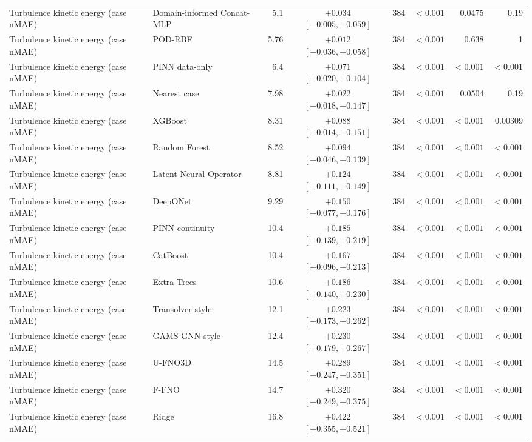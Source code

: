 \begin{landscape}
\begin{longtable}{p{4.0cm}p{3.4cm}rcrrrr}
Turbulence kinetic energy (case nMAE) & Domain-informed Concat-MLP & 5.1 & $+0.034$ $[-0.005, +0.059]$ & 384 & $< 0.001$ & 0.0475 & 0.19 \\
Turbulence kinetic energy (case nMAE) & POD-RBF & 5.76 & $+0.012$ $[-0.036, +0.058]$ & 384 & $< 0.001$ & 0.638 & 1 \\
Turbulence kinetic energy (case nMAE) & PINN data-only & 6.4 & $+0.071$ $[+0.020, +0.104]$ & 384 & $< 0.001$ & $< 0.001$ & $< 0.001$ \\
Turbulence kinetic energy (case nMAE) & Nearest case & 7.98 & $+0.022$ $[-0.018, +0.147]$ & 384 & $< 0.001$ & 0.0504 & 0.19 \\
Turbulence kinetic energy (case nMAE) & XGBoost & 8.31 & $+0.088$ $[+0.014, +0.151]$ & 384 & $< 0.001$ & $< 0.001$ & 0.00309 \\
Turbulence kinetic energy (case nMAE) & Random Forest & 8.52 & $+0.094$ $[+0.046, +0.139]$ & 384 & $< 0.001$ & $< 0.001$ & $< 0.001$ \\
Turbulence kinetic energy (case nMAE) & Latent Neural Operator & 8.81 & $+0.124$ $[+0.111, +0.149]$ & 384 & $< 0.001$ & $< 0.001$ & $< 0.001$ \\
Turbulence kinetic energy (case nMAE) & DeepONet & 9.29 & $+0.150$ $[+0.077, +0.176]$ & 384 & $< 0.001$ & $< 0.001$ & $< 0.001$ \\
Turbulence kinetic energy (case nMAE) & PINN continuity & 10.4 & $+0.185$ $[+0.139, +0.219]$ & 384 & $< 0.001$ & $< 0.001$ & $< 0.001$ \\
Turbulence kinetic energy (case nMAE) & CatBoost & 10.4 & $+0.167$ $[+0.096, +0.213]$ & 384 & $< 0.001$ & $< 0.001$ & $< 0.001$ \\
Turbulence kinetic energy (case nMAE) & Extra Trees & 10.6 & $+0.186$ $[+0.140, +0.230]$ & 384 & $< 0.001$ & $< 0.001$ & $< 0.001$ \\
Turbulence kinetic energy (case nMAE) & Transolver-style & 12.1 & $+0.223$ $[+0.173, +0.262]$ & 384 & $< 0.001$ & $< 0.001$ & $< 0.001$ \\
Turbulence kinetic energy (case nMAE) & GAMS-GNN-style & 12.4 & $+0.230$ $[+0.179, +0.267]$ & 384 & $< 0.001$ & $< 0.001$ & $< 0.001$ \\
Turbulence kinetic energy (case nMAE) & U-FNO3D & 14.5 & $+0.289$ $[+0.247, +0.351]$ & 384 & $< 0.001$ & $< 0.001$ & $< 0.001$ \\
Turbulence kinetic energy (case nMAE) & F-FNO & 14.7 & $+0.320$ $[+0.249, +0.375]$ & 384 & $< 0.001$ & $< 0.001$ & $< 0.001$ \\
Turbulence kinetic energy (case nMAE) & Ridge & 16.8 & $+0.422$ $[+0.355, +0.521]$ & 384 & $< 0.001$ & $< 0.001$ & $< 0.001$ \\

\end{longtable}
\end{landscape}
